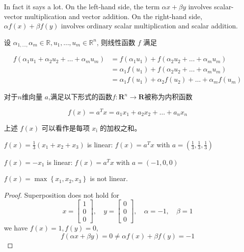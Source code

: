 In fact it says a lot. On the left-hand side, the term $ \alpha x+\beta y $ involves scalar-vector multiplication and vector addition. On the right-hand side, $ \alpha f(x)+\beta f(y) $ involves ordinary scalar multiplication and scalar addition.

\begin{corollary}
    设 $ \alpha_{1, \ldots,} \alpha_{m} \in \mathbb{R}, u_{1}, \ldots, u_{m} \in \mathbb{R}^{n} $, 则线性函数 $ f $ 满足

    $$ \begin{aligned} f\left(\alpha_{1} u_{1}+\alpha_{2} u_{2}+\ldots+\alpha_{m} u_{m}\right) &=f\left(\alpha_{1} u_{1}\right)+f\left(\alpha_{2} u_{2}+\ldots+\alpha_{m} u_{m}\right) \\ &=\alpha_{1} f\left(u_{1}\right)+f\left(\alpha_{2} u_{2}+\ldots+\alpha_{m} u_{m}\right) \\ &=\alpha_{1} f\left(u_{1}\right)+\alpha_{2} f\left(u_{2}\right)+\ldots+\alpha_{m} f\left(u_{m}\right) \end{aligned} $$
\end{corollary}

\begin{definition}
    对于$n$维向量 $ a $,满足以下形式的函数$ f: \mathbf{R}^{n} \rightarrow \mathbf{R} $被称为内积函数

    $$ f(x)=a^{T} x=a_{1} x_{1}+a_{2} x_{2}+\ldots+a_{n} x_{n} $$
\end{definition}

上述 $ f(x) $ 可以看作是每项 $ x_{\mathrm{i}} $ 的加权之和。 

\begin{example}
    $ f(x)=\frac{1}{3}\left(x_{1}+x_{2}+x_{3}\right) $ is linear: $ f(x)=a^{T} x $ with $ a=\left(\frac{1}{3}, \frac{1}{3}, \frac{1}{3}\right) $
\end{example}

\begin{example}
    $ f(x)=-x_{1} $ is linear: $ f(x)=a^{T} x $ with $ a=(-1,0,0) $
\end{example}

\begin{example}
    $ f(x)=\max \left\{x_{1}, x_{2}, x_{3}\right\} $ is not linear.
\end{example}

\begin{proof}
    Superposition does not hold for
$$
x=\left[\begin{array}{l}
1 \\
0 \\
0
\end{array}\right], \quad y=\left[\begin{array}{l}
0 \\
0 \\
0
\end{array}\right], \quad \alpha=-1, \quad \beta=1
$$
we have $ f(x)=1, f(y)=0 $,
$$
f(\alpha x+\beta y)=0 \neq \alpha f(x)+\beta f(y)=-1
$$
\end{proof}

